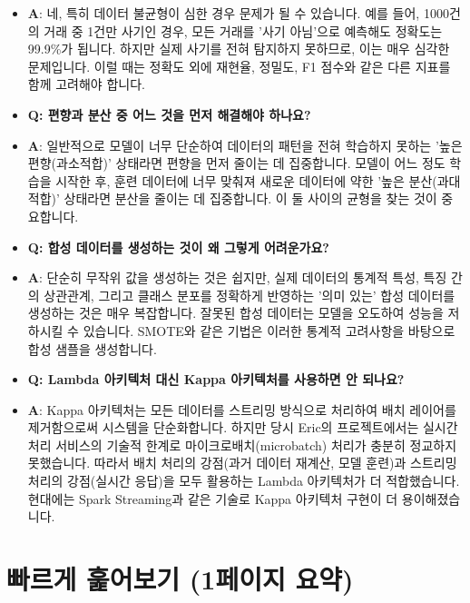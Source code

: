 \documentclass[11pt,a4paper]{article}
\theoremstyle{definition}
\begin{document}
\begin{itemize}
\begin{itemize}
\begin{itemize}
\begin{itemize}
\begin{itemize}
\begin{enumerate}
\begin{itemize}
    \textbf{Q: 모델의 정확도가 99\%인데도 문제가 될 수 있나요?}
    \item \textbf{A}: 네, 특히 데이터 불균형이 심한 경우 문제가 될 수 있습니다. 예를 들어, 1000건의 거래 중 1건만 사기인 경우, 모든 거래를 '사기 아님'으로 예측해도 정확도는 99.9\%가 됩니다. 하지만 실제 사기를 전혀 탐지하지 못하므로, 이는 매우 심각한 문제입니다. 이럴 때는 정확도 외에 재현율, 정밀도, F1 점수와 같은 다른 지표를 함께 고려해야 합니다.

    \item \textbf{Q: 편향과 분산 중 어느 것을 먼저 해결해야 하나요?}
    \item \textbf{A}: 일반적으로 모델이 너무 단순하여 데이터의 패턴을 전혀 학습하지 못하는 '높은 편향(과소적합)' 상태라면 편향을 먼저 줄이는 데 집중합니다. 모델이 어느 정도 학습을 시작한 후, 훈련 데이터에 너무 맞춰져 새로운 데이터에 약한 '높은 분산(과대적합)' 상태라면 분산을 줄이는 데 집중합니다. 이 둘 사이의 균형을 찾는 것이 중요합니다.

    \item \textbf{Q: 합성 데이터를 생성하는 것이 왜 그렇게 어려운가요?}
    \item \textbf{A}: 단순히 무작위 값을 생성하는 것은 쉽지만, 실제 데이터의 통계적 특성, 특징 간의 상관관계, 그리고 클래스 분포를 정확하게 반영하는 '의미 있는' 합성 데이터를 생성하는 것은 매우 복잡합니다. 잘못된 합성 데이터는 모델을 오도하여 성능을 저하시킬 수 있습니다. SMOTE와 같은 기법은 이러한 통계적 고려사항을 바탕으로 합성 샘플을 생성합니다.

    \item \textbf{Q: Lambda 아키텍처 대신 Kappa 아키텍처를 사용하면 안 되나요?}
    \item \textbf{A}: Kappa 아키텍처는 모든 데이터를 스트리밍 방식으로 처리하여 배치 레이어를 제거함으로써 시스템을 단순화합니다. 하지만 당시 Eric의 프로젝트에서는 실시간 처리 서비스의 기술적 한계로 마이크로배치(microbatch) 처리가 충분히 정교하지 못했습니다. 따라서 배치 처리의 강점(과거 데이터 재계산, 모델 훈련)과 스트리밍 처리의 강점(실시간 응답)을 모두 활용하는 Lambda 아키텍처가 더 적합했습니다. 현대에는 Spark Streaming과 같은 기술로 Kappa 아키텍처 구현이 더 용이해졌습니다.
\end{itemize}

\newpage
\section*{빠르게 훑어보기 (1페이지 요약)}

\begin{tcolorbox}[colback=myblue!20, colframe=blue!75!black, title=\textbf{CSCI103 Lecture 10 핵심 요약}, sharp corners, boxsep=5mm, left=3mm, right=3mm, top=3mm, bottom=3mm]


\end{tcolorbox}
\end{enumerate}
\end{itemize}
\end{itemize}
\end{itemize}
\end{itemize}
\end{itemize}
\end{document}
